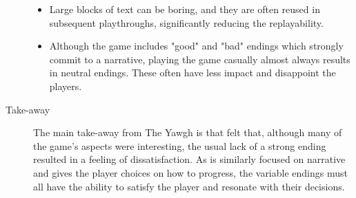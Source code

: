 \begin{description}
{\begin{itemize}
  \item {Large blocks of text can be boring, and they are often reused in subsequent playthroughs, significantly reducing the replayability.}
  \item {Although the game includes "good" and "bad" endings which strongly commit to a narrative, playing the game casually almost always results in neutral endings. These often have less impact and disappoint the players.}
\end{itemize}
}
\item[Take-away]{The main take-away from The Yawgh is that \ourteam{} felt that, although many of the game's aspects were interesting, the usual lack of a strong ending resulted in a feeling of dissatisfaction. As \ourgame{} is similarly focused on narrative and gives the player choices on how to progress, the variable endings must all have the ability to satisfy the player and resonate with their decisions.}
\end{description}


\clearpage
